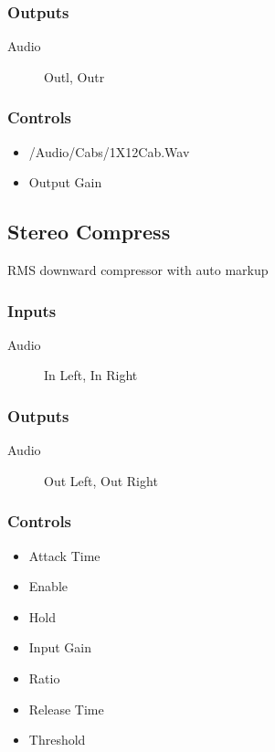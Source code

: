 \subsubsection{Outputs}
\begin{description}
\item [Audio] Outl, Outr
\end{description}

\subsubsection{Controls}
\begin{itemize}
\item /Audio/Cabs/1X12Cab.Wav
\item Output Gain
\end{itemize}

\subsection{Stereo Compress}

RMS downward compressor with auto markup



\subsubsection{Inputs}
\begin{description}
\item [Audio] In Left, In Right
\end{description}

\subsubsection{Outputs}
\begin{description}
\item [Audio] Out Left, Out Right
\end{description}

\subsubsection{Controls}
\begin{itemize}
\item Attack Time
\item Enable
\item Hold
\item Input Gain
\item Ratio
\item Release Time
\item Threshold
\end{itemize}

